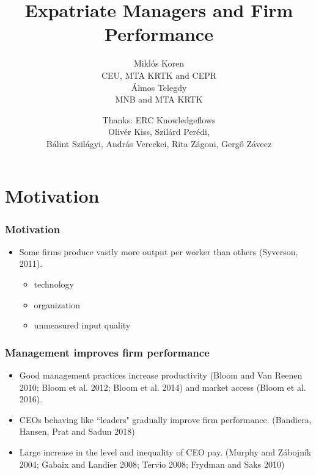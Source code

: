 \documentclass[aspectratio=169,compress,mathserif]{beamer}
\title{Expatriate Managers and Firm Performance}
\author{Miklós Koren\\
CEU, MTA KRTK and CEPR\\
Álmos Telegdy\\
MNB and MTA KRTK}
\date %
{Thanks: ERC Knowledgeflows\\Olivér Kiss, Szilárd Perédi,\\ Bálint Szilágyi, András Vereckei, Rita Zágoni, Gergő Závecz}
\begin{document}
\begin{frame}[plain]
  \titlepage
    \addtocounter{framenumber}{-1}
\end{frame}






\section{Motivation}\hypertarget{Motivation}{}
\begin{frame}\frametitle{Motivation}\hypertarget{Motivation}{}
\begin{itemize}
\item Some firms produce vastly more output per worker than others (Syverson, 2011).
\begin{itemize}
\item technology

\item organization

\item unmeasured input quality




\end{itemize}

\end{itemize}
\end{frame}



\begin{frame}\frametitle{Management improves firm performance}\hypertarget{Management improves firm performance}{}
\begin{itemize}
\item Good management practices  increase  productivity  (Bloom  and  Van  Reenen  2010;  Bloom  et  al.  2012;  Bloom  et  al.  2014) and market access (Bloom et al. 2016). 

\item CEOs behaving like ``leaders" gradually improve firm performance. (Bandiera, Hansen, Prat and Sadun 2018)

\item Large increase  in  the  level  and  inequality  of  CEO  pay.  (Murphy  and  Zábojník  2004;  Gabaix  and  Landier  2008;  Tervio  2008; Frydman and Saks 2010)


\end{itemize}
\end{frame}
\end{document}
